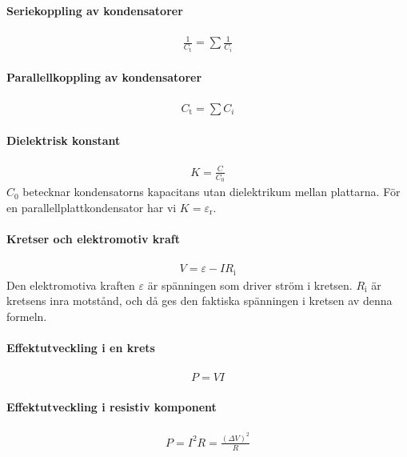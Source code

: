 \paragraph{Seriekoppling av kondensatorer}
\begin{align*}
	\frac{1}{C_\text{t}} = \sum\frac{1}{C_i}
\end{align*}

\deriv

\paragraph{Parallellkoppling av kondensatorer}
\begin{align*}
	C_\text{t} = \sum C_i
\end{align*}

\paragraph{Dielektrisk konstant}
\begin{align*}
	K = \frac{C}{C_0}
\end{align*}
$C_0$ betecknar kondensatorns kapacitans utan dielektrikum mellan plattarna. För en parallellplattkondensator har vi $K = \varepsilon_\text{r}$.

\paragraph{Kretser och elektromotiv kraft}
\begin{align*}
	V = \varepsilon - IR_\text{i}
\end{align*}
Den elektromotiva kraften $\varepsilon$ är spänningen som driver ström i kretsen. $R_\text{i}$ är kretsens inra motstånd, och då ges den faktiska spänningen i kretsen av denna formeln.

\deriv

\paragraph{Effektutveckling i en krets}
\begin{align*}
	P = VI
\end{align*}

\paragraph{Effektutveckling i resistiv komponent}
\begin{align*}
	P = I^2R = \frac{(\Delta V)^2}{R}
\end{align*}

